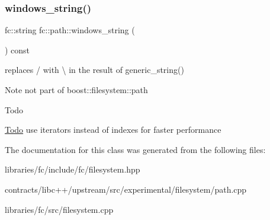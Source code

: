 \subsubsection{\texorpdfstring{windows\+\_\+string()}{windows\_string()}}
{\footnotesize\ttfamily fc\+::string fc\+::path\+::windows\+\_\+string (\begin{DoxyParamCaption}{ }\end{DoxyParamCaption}) const}



replaces \textquotesingle{}/\textquotesingle{} with \textquotesingle{}\textbackslash{}\textquotesingle{} in the result of generic\+\_\+string() 

\begin{DoxyNote}{Note}
not part of boost\+::filesystem\+::path
\end{DoxyNote}
\begin{DoxyRefDesc}{Todo}
\item[\mbox{\hyperlink{todo__todo000001}{Todo}}]use iterators instead of indexes for faster performance \end{DoxyRefDesc}


The documentation for this class was generated from the following files\+:\begin{DoxyCompactItemize}
\item 
libraries/fc/include/fc/filesystem.\+hpp\item 
contracts/libc++/upstream/src/experimental/filesystem/path.\+cpp\item 
libraries/fc/src/filesystem.\+cpp\end{DoxyCompactItemize}
